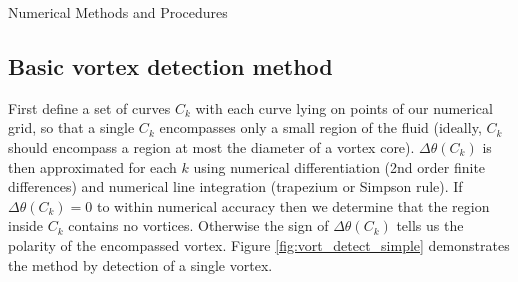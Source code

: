\begin{chapter}{\label{cha:numerics}Numerical Methods and Procedures}
\subsection{\label{section:vortexloc} Basic vortex detection method}
First define a set of curves $C_k$ with each curve lying on points of our numerical grid, so that a single $C_k$ encompasses only a small region of the fluid (ideally, $C_k$ should encompass a region at most the diameter of a vortex core). $\Delta\theta(C_k)$ is then approximated for each $k$ using numerical differentiation (2nd order finite differences) and numerical line integration (trapezium or Simpson rule). If $\Delta\theta(C_k) = 0$ to within numerical accuracy then we determine that the region inside $C_k$ contains no vortices. Otherwise the sign of $\Delta\theta(C_k)$ tells us the polarity of the encompassed vortex. Figure \ref{fig:vort_detect_simple} demonstrates the method by detection of a single vortex.


\end{chapter}
